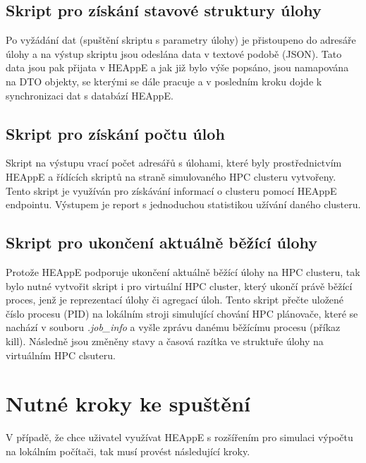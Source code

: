 \subsection{Skript pro získání stavové struktury úlohy}
Po vyžádání dat (spuštění skriptu s parametry úlohy) je přistoupeno do adresáře úlohy a na výstup skriptu jsou odeslána data v textové podobě (JSON). Tato data jsou pak přijata v HEAppE a jak již bylo výše popsáno, jsou namapována na DTO objekty, se kterými se dále pracuje a v posledním kroku dojde k synchronizaci dat s databází HEAppE.

\subsection{Skript pro získání počtu úloh}
Skript na výstupu vrací počet adresářů s úlohami, které byly prostřednictvím HEAppE a řídících skriptů na straně simulovaného HPC clusteru vytvořeny. Tento skript je využíván pro získávání informací o clusteru pomocí HEAppE endpointu. Výstupem je report s jednoduchou statistikou užívání daného clusteru.

\subsection{Skript pro ukončení aktuálně běžící úlohy}
Protože HEAppE podporuje ukončení aktuálně běžící úlohy na HPC clusteru, tak bylo nutné vytvořit skript i pro virtuální HPC cluster, který ukončí právě běžící proces, jenž je reprezentací úlohy či agregací úloh. Tento skript přečte uložené číslo procesu (PID) na lokálním stroji simulující chování HPC plánovače, které se nachází v souboru \emph{.job\_info} a vyšle zprávu danému běžícímu procesu (příkaz kill). Následně jsou změněny stavy a časová razítka ve struktuře úlohy na virtuálním HPC clsuteru.

\section{Nutné kroky ke spuštění}
V případě, že chce uživatel využívat HEAppE s rozšířením pro simulaci výpočtu na lokálním počítači, tak musí provést následující kroky.

